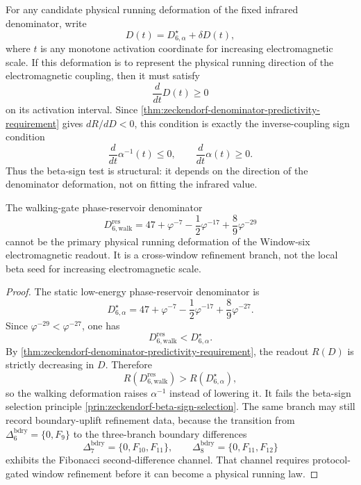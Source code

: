 \begin{principle}
\label{prin:zeckendorf-beta-sign-selection}
For any candidate physical running deformation of the fixed infrared
denominator, write
$$
  D(t)=D_{6,\alpha}^{\star}+\delta D(t),
$$
where $t$ is any monotone activation coordinate for increasing
electromagnetic scale. If this deformation is to represent the physical
running direction of the electromagnetic coupling, then it must satisfy
$$
  \frac{d}{dt}D(t)\geq0
$$
on its activation interval. Since
\autoref{thm:zeckendorf-denominator-predictivity-requirement} gives
$dR/dD<0$, this condition is exactly the inverse-coupling sign condition
$$
  \frac{d}{dt}\alpha^{-1}(t)\leq0,
  \qquad
  \frac{d}{dt}\alpha(t)\geq0.
$$
Thus the beta-sign test is structural: it depends on the direction of
the denominator deformation, not on fitting the infrared value.
\end{principle}

\begin{theorem}
\label{thm:zeckendorf-walking-branch-not-physical-running}
The walking-gate phase-reservoir denominator
$$
  D_{6,\mathrm{walk}}^{\mathrm{res}}
  =
  47+\varphi^{-7}-\frac12\varphi^{-17}+\frac89\varphi^{-29}
$$
cannot be the primary physical running deformation of the Window-six
electromagnetic readout. It is a cross-window refinement branch, not the
local beta seed for increasing electromagnetic scale.
\end{theorem}
\begin{proof}
The static low-energy phase-reservoir denominator is
$$
  D_{6,\alpha}^{\star}
  =
  47+\varphi^{-7}-\frac12\varphi^{-17}+\frac89\varphi^{-27}.
$$
Since $\varphi^{-29}<\varphi^{-27}$, one has
$$
  D_{6,\mathrm{walk}}^{\mathrm{res}}<D_{6,\alpha}^{\star}.
$$
By \autoref{thm:zeckendorf-denominator-predictivity-requirement}, the
readout $R(D)$ is strictly decreasing in $D$. Therefore
$$
  R(D_{6,\mathrm{walk}}^{\mathrm{res}})
  >
  R(D_{6,\alpha}^{\star}),
$$
so the walking deformation raises $\alpha^{-1}$ instead of lowering it.
It fails the beta-sign selection principle
\autoref{prin:zeckendorf-beta-sign-selection}. The same branch may still
record boundary-uplift refinement data, because the transition from
$\Delta^{\mathrm{bdry}}_6=\{0,F_9\}$ to the three-branch boundary
differences
$$
  \Delta^{\mathrm{bdry}}_7=\{0,F_{10},F_{11}\},
  \qquad
  \Delta^{\mathrm{bdry}}_8=\{0,F_{11},F_{12}\}
$$
exhibits the Fibonacci second-difference channel. That channel requires
protocol-gated window refinement before it can become a physical running
law.
\end{proof}

